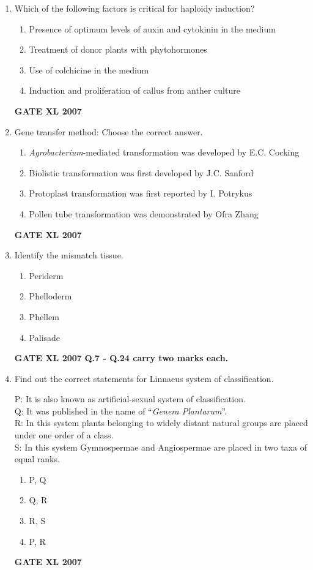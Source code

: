 \documentclass[journal,12pt,onecolumn]{IEEEtran}
\begin{document}
\begin{enumerate}
    \item Which of the following factors is critical for haploidy induction?
    \begin{enumerate}
        \item Presence of optimum levels of auxin and cytokinin in the medium
        \item Treatment of donor plants with phytohormones
        \item Use of colchicine in the medium
        \item Induction and proliferation of callus from anther culture
    \end{enumerate}\hfill{\textbf{GATE XL 2007}}

    \item Gene transfer method: Choose the correct answer.
    \begin{enumerate}
        \item \textit{Agrobacterium}-mediated transformation was developed by E.C. Cocking
        \item Biolistic transformation was first developed by J.C. Sanford
        \item Protoplast transformation was first reported by I. Potrykus
        \item Pollen tube transformation was demonstrated by Ofra Zhang
    \end{enumerate}\hfill{\textbf{GATE XL 2007}}

    \item Identify the mismatch tissue.
    \begin{enumerate}
        \item Periderm
        \item Phelloderm
        \item Phellem
        \item Palisade
    \end{enumerate}\hfill{\textbf{GATE XL 2007}}
\noindent\textbf{Q.7 - Q.24 carry two marks each.}

    \item Find out the correct statements for Linnaeus system of classification.
    
    P: It is also known as artificial-sexual system of classification. \\
    Q: It was published in the name of ``\textit{Genera Plantarum}''. \\
    R: In this system plants belonging to widely distant natural groups are placed under one order of a class. \\
    S: In this system Gymnospermae and Angiospermae are placed in two taxa of equal ranks.
    \begin{enumerate}
        \item P, Q
        \item Q, R
        \item R, S
        \item P, R
    \end{enumerate}\hfill{\textbf{GATE XL 2007}}


\end{enumerate}
\end{document}
